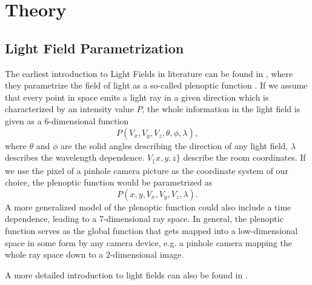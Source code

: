\documentclass  [
  paper    = a4,
  BCOR     = 10mm,
  twoside,
  fontsize = 12pt,
  fleqn,
  toc      = bibnumbered,
  toc      = listofnumbered,
  numbers  = noendperiod,
  headings = normal,
  listof   = leveldown,
  version  = 3.03
]                                       {scrreprt}
\begin{document}
\chapter{Theory}
\section{Light Field Parametrization}
The earliest introduction to Light Fields in literature can be found in \cite{adelson1991plenoptic}, where they parametrize the field of light as a  so-called \glqq plenoptic function \grqq. If we assume that every point in space emits a light ray  in a given direction which is characterized by an intensity value $P$, the whole information in the light field is given as a 6-dimensional function
\begin{equation}\label{key}
P(V_x,V_y, V_z, \theta, \phi, \lambda),
\end{equation}
where $\theta$ and $\phi$ are the solid angles describing the direction of any light field, $\lambda$ describes the wavelength dependence. $V_\{x,y,z\}$ describe the room coordinates. If we use the pixel of a pinhole camera picture as the coordinate system of our choice, the plenoptic function would be parametrized as 
\begin{equation}\label{eq:plenoptic}
P(x,y, V_x, V_y, V_z, \lambda).
\end{equation}
 A more generalized model of the plenoptic function could also include a time dependence, leading to a 7-dimensional ray space. In general, the plenoptic function serves as the global function that gets mapped into a low-dimensional space in some form by any camera device, e.g. a pinhole camera mapping the whole ray space down to a 2-dimensional image.\\
 	
 A more detailed introduction to light fields can also be found in \cite{wanner2014orientation}. 
\end{document}

